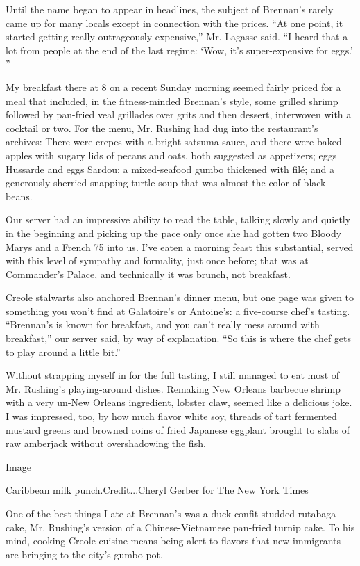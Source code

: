 Until the name began to appear in headlines, the subject of Brennan's
rarely came up for many locals except in connection with the prices.
``At one point, it started getting really outrageously expensive,'' Mr.
Lagasse said. ``I heard that a lot from people at the end of the last
regime: `Wow, it's super-expensive for eggs.' ''

My breakfast there at 8 on a recent Sunday morning seemed fairly priced
for a meal that included, in the fitness-minded Brennan's style, some
grilled shrimp followed by pan-fried veal grillades over grits and then
dessert, interwoven with a cocktail or two. For the menu, Mr. Rushing
had dug into the restaurant's archives: There were crepes with a bright
satsuma sauce, and there were baked apples with sugary lids of pecans
and oats, both suggested as appetizers; eggs Hussarde and eggs Sardou; a
mixed-seafood gumbo thickened with filé; and a generously sherried
snapping-turtle soup that was almost the color of black beans.

Our server had an impressive ability to read the table, talking slowly
and quietly in the beginning and picking up the pace only once she had
gotten two Bloody Marys and a French 75 into us. I've eaten a morning
feast this substantial, served with this level of sympathy and
formality, just once before; that was at Commander's Palace, and
technically it was brunch, not breakfast.

Creole stalwarts also anchored Brennan's dinner menu, but one page was
given to something you won't find at
\href{http://www.galatoires.com/home}{Galatoire's} or
\href{http://www.antoines.com/}{Antoine's}: a five-course chef's
tasting. ``Brennan's is known for breakfast, and you can't really mess
around with breakfast,'' our server said, by way of explanation. ``So
this is where the chef gets to play around a little bit.''

Without strapping myself in for the full tasting, I still managed to eat
most of Mr. Rushing's playing-around dishes. Remaking New Orleans
barbecue shrimp with a very un-New Orleans ingredient, lobster claw,
seemed like a delicious joke. I was impressed, too, by how much flavor
white soy, threads of tart fermented mustard greens and browned coins of
fried Japanese eggplant brought to slabs of raw amberjack without
overshadowing the fish.

Image

Caribbean milk punch.Credit...Cheryl Gerber for The New York Times

One of the best things I ate at Brennan's was a duck-confit-studded
rutabaga cake, Mr. Rushing's version of a Chinese-Vietnamese pan-fried
turnip cake. To his mind, cooking Creole cuisine means being alert to
flavors that new immigrants are bringing to the city's gumbo pot.

